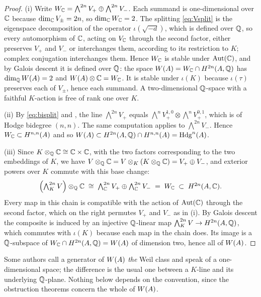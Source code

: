 \begin{proof}
(i) Write $W_{\mathbb{C}}=\bigwedge^{2n}V_{+}\oplus\bigwedge^{2n}V_{-}$. Each summand
is one-dimensional over $\mathbb{C}$ because $\dim_{\mathbb{C}}V_{\pm}=2n$, so
$\dim_{\mathbb{C}}W_{\mathbb{C}}=2$. The splitting \eqref{eq:Vsplit} is the eigenspace
decomposition of the operator $\iota(\sqrt{-d})$, which is defined over $\mathbb{Q}$,
so every automorphism of $\mathbb{C}$, acting on $V_{\mathbb{C}}$ through the second
factor, either preserves $V_{+}$ and $V_{-}$ or interchanges them, according
to its restriction to $K$; complex conjugation interchanges them. Hence
$W_{\mathbb{C}}$ is stable under $\mathrm{Aut}(\mathbb{C})$, and by Galois descent it is
defined over $\mathbb{Q}$: the space $W(A)=W_{\mathbb{C}}\cap H^{2n}(A,\mathbb{Q})$ has
$\dim_{\mathbb{Q}}W(A)=2$ and $W(A)\otimes\mathbb{C}=W_{\mathbb{C}}$. It is stable under $\iota(K)$ because
$\iota(\tau)$ preserves each of $V_{\pm}$, hence each summand. A
two-dimensional $\mathbb{Q}$-space with a faithful $K$-action is free of rank one
over $K$.

(ii) By \eqref{eq:bisplit} and , the line
$\bigwedge^{2n}V_{+}$ equals
$\bigwedge^{n}V^{1,0}_{+}\otimes\bigwedge^{n}V^{0,1}_{+}$, which is of Hodge
bidegree $(n,n)$. The same computation applies to $\bigwedge^{2n}V_{-}$.
Hence $W_{\mathbb{C}}\subset H^{n,n}(A)$ and so
$W(A)\subset H^{2n}(A,\mathbb{Q})\cap H^{n,n}(A)=\mathrm{Hdg}^{n}(A)$.

(iii) Since $K\otimes_{\mathbb{Q}}\mathbb{C}\cong\mathbb{C}\times\mathbb{C}$, with the two factors
corresponding to the two embeddings of $K$, we have
$V\otimes_{\mathbb{Q}}\mathbb{C}=V\otimes_{K}(K\otimes_{\mathbb{Q}}\mathbb{C})=V_{+}\oplus V_{-}$, and
exterior powers over $K$ commute with this base change:
\[
  \Bigl(\textstyle\bigwedge^{2n}_{K}V\Bigr)\otimes_{\mathbb{Q}}\mathbb{C}
  \;\cong\;\textstyle\bigwedge^{2n}_{\mathbb{C}}V_{+}\oplus\bigwedge^{2n}_{\mathbb{C}}V_{-}
  \;=\;W_{\mathbb{C}}\;\subset\;H^{2n}(A,\mathbb{C}).
\]
Every map in this chain is compatible with the action of $\mathrm{Aut}(\mathbb{C})$
through the second factor, which on the right permutes $V_{+}$ and $V_{-}$ as in (i).
By Galois descent the composite is induced by an injective $\mathbb{Q}$-linear map
$\bigwedge^{2n}_{K}V\to H^{2n}(A,\mathbb{Q})$, which commutes with $\iota(K)$ because
each map in the chain does. Its image is a $\mathbb{Q}$-subspace of
$W_{\mathbb{C}}\cap H^{2n}(A,\mathbb{Q})=W(A)$ of dimension two, hence all of $W(A)$.
\end{proof}

\begin{remark}\label{rem:onedim}
Some authors call a generator of $W(A)$ \emph{the} Weil class and speak of a
one-dimensional space; the difference is the usual one between a $K$-line and
its underlying $\mathbb{Q}$-plane. Nothing below depends on the convention, since
the obstruction theorems concern the whole of $W(A)$.
\end{remark}

